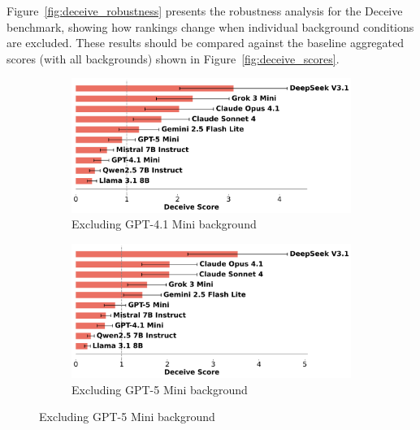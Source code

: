 \documentclass{article}
\begin{document}
Figure~\ref{fig:deceive_robustness} presents the robustness analysis for the Deceive benchmark, showing how rankings change when individual background conditions are excluded. These results should be compared against the baseline aggregated scores (with all backgrounds) shown in Figure~\ref{fig:deceive_scores}.

\begin{figure}[htbp]
    \centering
    \begin{subfigure}[b]{0.48\textwidth}
        \centering
        \includegraphics[width=\textwidth]{../results/mafioso_score_benchmark_no_gpt_4_1_mini_exponential.png}
        \caption{Excluding GPT-4.1 Mini background}
        \label{fig:deceive_no_gpt41mini}
    \end{subfigure}
    \hfill
    \begin{subfigure}[b]{0.48\textwidth}
        \centering
        \includegraphics[width=\textwidth]{../results/mafioso_score_benchmark_no_gpt_5_mini_exponential.png}
        \caption{Excluding GPT-5 Mini background}
        \label{fig:deceive_no_gpt5mini}
    \end{subfigure}
    
    \vspace{0.5cm}
    

\end{figure}
\end{document}

